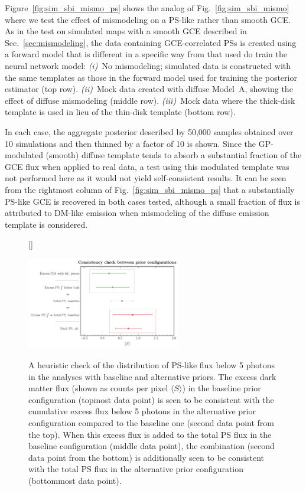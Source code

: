 \documentclass[prd,aps,10pt,nofootinbib,twocolumn,superscriptaddress,preprintnumbers,balancelastpage,longbibliography,floatfix]{revtex4-2}
\begin{document}
Figure~\ref{fig:sim_sbi_mismo_ps} shows the analog of Fig.~\ref{fig:sim_sbi_mismo} where we test the effect of mismodeling on a PS-like rather than smooth GCE. As in the test on simulated maps with a smooth GCE described in Sec.~\ref{sec:mismodeling}, the data containing GCE-correlated PSs is created using a forward model that is different in a specific way from that used do train the neural network model: \emph{(i)}~No mismodeling; simulated data is constructed with the same templates as those in the forward model used for training the posterior estimator (top row). \emph{(ii)}~Mock data created with diffuse {Model~A}, showing the effect of diffuse mismodeling (middle row). \emph{(iii)}~Mock data where the thick-disk template is used in lieu of the thin-disk template (bottom row). 

In each case, the aggregate posterior described by 50,000 samples obtained over 10 simulations and then thinned by a factor of 10 is shown. Since the GP-modulated (smooth) diffuse template tends to absorb a substantial fraction of the GCE flux when applied to real \Fermi data, a test using this modulated template was not performed here as it would not yield self-consistent results.
It can be seen from the rightmost column of Fig.~\ref{fig:sim_sbi_mismo_ps} that a substantially PS-like GCE is recovered in both cases tested, although a small fraction of flux is attributed to DM-like emission when mismodeling of the diffuse emission template is considered.

%
\begin{figure}[!htbp]
[\FBwidth]
{\caption{A heuristic check of the distribution of PS-like flux below 5 photons in the analyses with baseline and alternative priors. The excess dark matter flux (shown as counts per pixel $\langle S \rangle$) in the baseline prior configuration (topmost data point) is seen to be consistent with the cumulative excess flux below 5 photons in the alternative prior configuration compared to the baseline one (second data point from the top). When this excess flux is added to the total PS flux in the baseline configuration (middle data point), the combination (second data point from the bottom) is additionally seen to be consistent with the total PS flux in the alternative prior configuration (bottommost data point).}
\label{fig:consistency}}
{\includegraphics[width=0.6\textwidth]{consistency_check.pdf}}
\end{figure}
%
\end{document}
